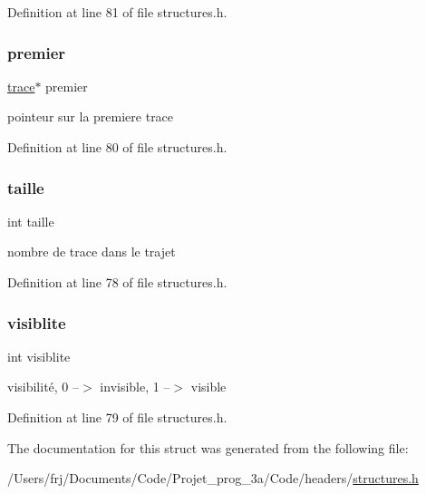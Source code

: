 Definition at line 81 of file structures.\+h.

\hypertarget{structtrajet_acc04ed138412836472c25ba9913c7474}{}\label{structtrajet_acc04ed138412836472c25ba9913c7474} 
\subsubsection{\texorpdfstring{premier}{premier}}
{\footnotesize\ttfamily \hyperlink{structtrace}{trace}$\ast$ premier}

pointeur sur la premiere trace 

Definition at line 80 of file structures.\+h.

\hypertarget{structtrajet_a29bf3fc0ffe4e72e45f0c84ab4f8cd1e}{}\label{structtrajet_a29bf3fc0ffe4e72e45f0c84ab4f8cd1e} 
\subsubsection{\texorpdfstring{taille}{taille}}
{\footnotesize\ttfamily int taille}

nombre de trace dans le trajet 

Definition at line 78 of file structures.\+h.

\hypertarget{structtrajet_a46e7ab7119b26df81cade0dc996c4e18}{}\label{structtrajet_a46e7ab7119b26df81cade0dc996c4e18} 
\subsubsection{\texorpdfstring{visiblite}{visiblite}}
{\footnotesize\ttfamily int visiblite}

visibilité, 0 --$>$ invisible, 1 --$>$ visible 

Definition at line 79 of file structures.\+h.



The documentation for this struct was generated from the following file\+:\begin{DoxyCompactItemize}
\item 
/\+Users/frj/\+Documents/\+Code/\+Projet\+\_\+prog\+\_\+3a/\+Code/headers/\hyperlink{structures_8h}{structures.\+h}\end{DoxyCompactItemize}
